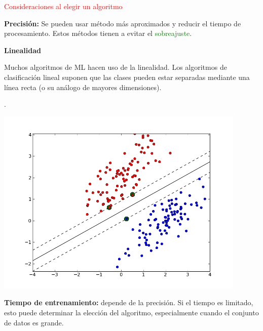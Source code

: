 \documentclass[11pt]{beamer}
\begin{document}
\begin{frame}{\textcolor{red}{Consideraciones al elegir un algoritmo}}
\begin{itemize}
\scriptsize{\item \textbf{Precisi\'on:} Se pueden usar m\'etodo m\'as aproximados y reducir el tiempo de procesamiento. Estos m\'etodos tienen a evitar el \textcolor{green}{sobreajuste}. 

\item \textbf{Linealidad}

Muchos algoritmos de ML hacen uso de la linealidad. Los algoritmos de clasificaci\'on lineal suponen que las clases pueden estar separadas mediante una l\'inea recta (o su an\'alogo de mayores dimensiones). }.


\begin{center}
		\includegraphics[width=0.45 \textwidth]{ML18.png}	
\end{center}
\item \textbf{Tiempo de entrenamiento:} depende de la precisi\'on. Si el tiempo es limitado, esto puede determinar la elecci\'on del algoritmo, especialmente cuando el conjunto de datos es grande.
\end{itemize}
\end{frame}
\end{document}

